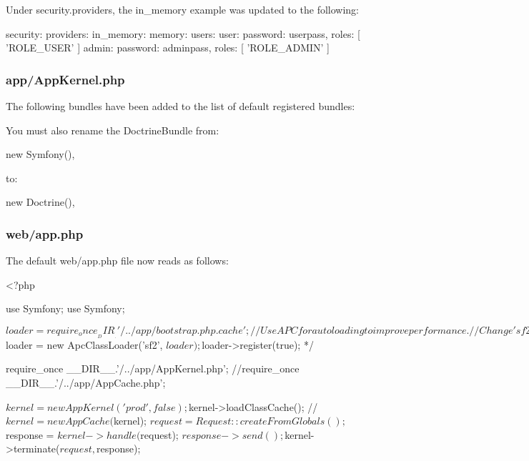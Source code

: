 Under {\ttfamily security.\+providers}, the {\ttfamily in\+\_\+memory} example was updated to the following\+: \begin{DoxyVerb}security:
    providers:
            in_memory:
                memory:
                    users:
                        user:  { password: userpass, roles: [ 'ROLE_USER' ] }
                        admin: { password: adminpass, roles: [ 'ROLE_ADMIN' ] }
\end{DoxyVerb}


\subsubsection*{{\ttfamily app/\+App\+Kernel.\+php}}

The following bundles have been added to the list of default registered bundles\+: 


You must also rename the Doctrine\+Bundle from\+: \begin{DoxyVerb}new Symfony\Bundle\DoctrineBundle\DoctrineBundle(),
\end{DoxyVerb}


to\+: \begin{DoxyVerb}new Doctrine\Bundle\DoctrineBundle\DoctrineBundle(),
\end{DoxyVerb}


\subsubsection*{{\ttfamily web/app.\+php}}

The default {\ttfamily web/app.\+php} file now reads as follows\+: \begin{DoxyVerb}<?php

use Symfony\Component\ClassLoader\ApcClassLoader;
use Symfony\Component\HttpFoundation\Request;

$loader = require_once __DIR__.'/../app/bootstrap.php.cache';

// Use APC for autoloading to improve performance.
// Change 'sf2' to a unique prefix in order to prevent cache key conflicts
// with other applications also using APC.
/*
$loader = new ApcClassLoader('sf2', $loader);
$loader->register(true);
*/

require_once __DIR__.'/../app/AppKernel.php';
//require_once __DIR__.'/../app/AppCache.php';

$kernel = new AppKernel('prod', false);
$kernel->loadClassCache();
//$kernel = new AppCache($kernel);
$request = Request::createFromGlobals();
$response = $kernel->handle($request);
$response->send();
$kernel->terminate($request, $response);
\end{DoxyVerb}


